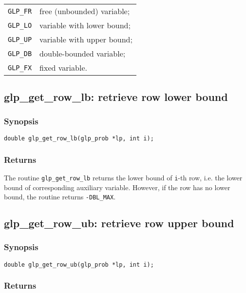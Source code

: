 \begin{tabular}{@{}ll}
\verb|GLP_FR| & free (unbounded) variable; \\
\verb|GLP_LO| & variable with lower bound; \\
\verb|GLP_UP| & variable with upper bound; \\
\verb|GLP_DB| & double-bounded variable; \\
\verb|GLP_FX| & fixed variable. \\
\end{tabular}

\subsection{glp\_get\_row\_lb: retrieve row lower bound}

\subsubsection*{Synopsis}

\begin{verbatim}
double glp_get_row_lb(glp_prob *lp, int i);
\end{verbatim}

\subsubsection*{Returns}

The routine \verb|glp_get_row_lb| returns the lower bound of
\verb|i|-th row, i.e. the lower bound of corresponding auxiliary
variable. However, if the row has no lower bound, the routine returns
\verb|-DBL_MAX|.

\subsection{glp\_get\_row\_ub: retrieve row upper bound}

\subsubsection*{Synopsis}

\begin{verbatim}
double glp_get_row_ub(glp_prob *lp, int i);
\end{verbatim}

\subsubsection*{Returns}

